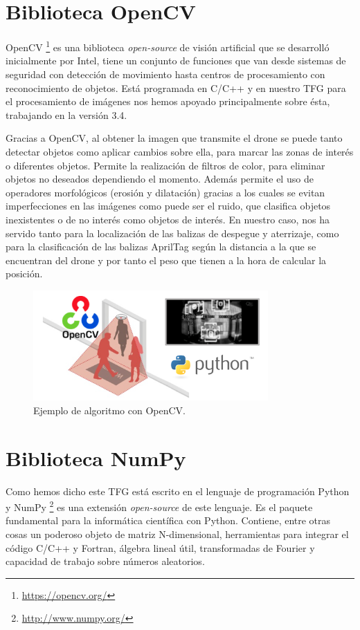 \section{Biblioteca OpenCV}
\hspace{1cm} OpenCV \footnote{\url{https://opencv.org/}} es una biblioteca \textit{open-source} de visión artificial que se desarrolló inicialmente por Intel, tiene un conjunto de funciones que van desde sistemas de seguridad con detección de movimiento hasta centros de procesamiento con reconocimiento de objetos. Está programada en C/C++ y en nuestro TFG para el procesamiento de imágenes nos hemos apoyado principalmente sobre ésta, trabajando en la versión 3.4. 

\hspace{1cm} Gracias a OpenCV, al obtener la imagen que transmite el drone se puede tanto detectar objetos como aplicar cambios sobre ella, para marcar las zonas de interés o diferentes objetos. Permite la realización de filtros de color, para eliminar objetos no deseados dependiendo el momento. Además permite el uso de operadores morfológicos (erosión y dilatación) gracias a los cuales se evitan imperfecciones en las imágenes como puede ser el ruido, que clasifica objetos inexistentes o de no interés como objetos de interés. En nuestro caso, nos ha servido tanto para la localización de las balizas de despegue y aterrizaje, como para la clasificación de las balizas AprilTag según la distancia a la que se encuentran del drone y por tanto el peso que tienen a la hora de calcular la posición.
\\

\begin{figure}[H]
	\begin{center}
		\includegraphics[width=0.8\textwidth]{imag/IMG26.png}
				\caption{Ejemplo de algoritmo con OpenCV.} 
	\label{fig:OpenCV.}	
	\end{center}
\end{figure}

\section{Biblioteca NumPy}
\hspace{1cm} Como hemos dicho este TFG está escrito en el lenguaje de programación Python y NumPy \footnote{\url{http://www.numpy.org/}} es una extensión \textit{open-source} de este lenguaje. Es el paquete fundamental para la informática científica con Python. Contiene, entre otras cosas un poderoso objeto de matriz N-dimensional, herramientas para integrar el código C/C++ y Fortran, álgebra lineal útil, transformadas de Fourier y capacidad de trabajo sobre números aleatorios. 

